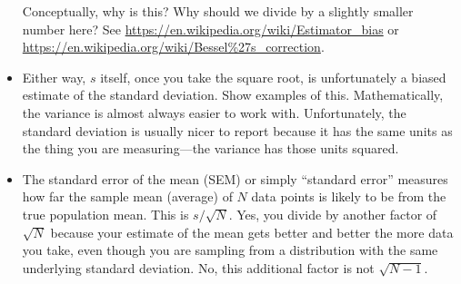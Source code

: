 \documentclass[11pt]{hmcpset}
\begin{document}
\begin{problem}
\begin{itemize}
		Conceptually, why is this? Why should we divide by a slightly smaller number here? See \url{https://en.wikipedia.org/wiki/Estimator_bias} or \url{https://en.wikipedia.org/wiki/Bessel%27s_correction}.
		\item Either way, $s$ itself, once you take the square root, is unfortunately a biased estimate of the standard deviation. Show examples of this. Mathematically, the variance is almost always easier to work with. Unfortunately, the standard deviation is usually nicer to report because it has the same units as the thing you are measuring---the variance has those units squared.
		\item The standard error of the mean (SEM) or simply ``standard error'' measures how far the sample mean (average) of $N$ data points is likely to be from the true population mean. This is $s/\sqrt{N}$. Yes, you divide by another factor of $\sqrt{N}$ because your estimate of the mean gets better and better the more data you take, even though you are sampling from a distribution with the same underlying standard deviation. No, this additional factor is not $\sqrt{N-1}$.
	\end{itemize}
\end{problem}

\end{document}
